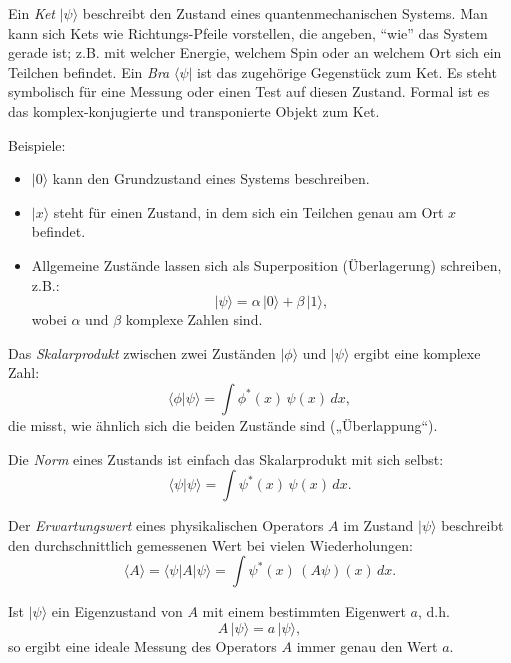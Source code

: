 Ein \emph{Ket} $|\psi\rangle$ beschreibt den Zustand eines quantenmechanischen Systems.
Man kann sich Kets wie Richtungs-Pfeile vorstellen, die angeben, ``wie'' das System gerade ist;
z.B. mit welcher Energie, welchem Spin oder an welchem Ort sich ein Teilchen befindet.
Ein \emph{Bra} $\langle\psi|$ ist das zugehörige Gegenstück zum Ket.
Es steht symbolisch für eine Messung oder einen Test auf diesen Zustand.
Formal ist es das komplex-konjugierte und transponierte Objekt zum Ket.

Beispiele:
\begin{itemize}
  \item $|0\rangle$ kann den Grundzustand eines Systems beschreiben.
  \item $|x\rangle$ steht für einen Zustand, in dem sich ein Teilchen genau am Ort $x$ befindet.
  \item Allgemeine Zustände lassen sich als Superposition (Überlagerung) schreiben, z.B.:
  \[
    |\psi\rangle = \alpha\,|0\rangle + \beta\,|1\rangle,
  \]
  wobei $\alpha$ und $\beta$ komplexe Zahlen sind.
\end{itemize}

Das \emph{Skalarprodukt} zwischen zwei Zuständen $|\phi\rangle$ und $|\psi\rangle$ ergibt eine komplexe Zahl:
\begin{equation}
  \langle \phi | \psi \rangle = \int \phi^*(x)\,\psi(x)\,dx,
\end{equation}
die misst, wie ähnlich sich die beiden Zustände sind („Überlappung“).

Die \emph{Norm} eines Zustands ist einfach das Skalarprodukt mit sich selbst:
\begin{equation}
  \langle \psi | \psi \rangle = \int \psi^*(x)\,\psi(x)\,dx.
\end{equation}

Der \emph{Erwartungswert} eines physikalischen Operators $A$ im Zustand $|\psi\rangle$ beschreibt den durchschnittlich gemessenen Wert bei vielen Wiederholungen:
\begin{equation}
  \langle A \rangle = \langle \psi | A | \psi \rangle = \int \psi^*(x)\,(A\psi)(x)\,dx.
\end{equation}

Ist $|\psi\rangle$ ein Eigenzustand von $A$ mit einem bestimmten Eigenwert $a$, d.h.
\begin{equation}
  A\,|\psi\rangle = a\,|\psi\rangle,
\end{equation}
so ergibt eine ideale Messung des Operators $A$ immer genau den Wert $a$.

